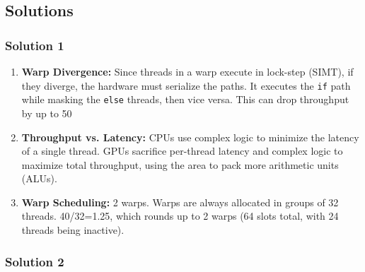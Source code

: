\subsection*{Solutions}

\subsubsection{Solution 1}

\begin{enumerate}[label=(\alph*)]
\item \textbf{Warp Divergence:} Since threads in a warp execute in lock-step (SIMT), if they diverge, the hardware must serialize the paths. It executes the \texttt{if} path while masking the \texttt{else} threads, then vice versa. This can drop throughput by up to 50%
\item \textbf{Throughput vs. Latency:} CPUs use complex logic to minimize the latency of a single thread. GPUs sacrifice per-thread latency and complex logic to maximize total throughput, using the area to pack more arithmetic units (ALUs).
\item \textbf{Warp Scheduling:} 2 warps. Warps are always allocated in groups of 32 threads. 40/32=1.25, which rounds up to 2 warps (64 slots total, with 24 threads being inactive).
\end{enumerate}

\subsubsection{Solution 2}



    

